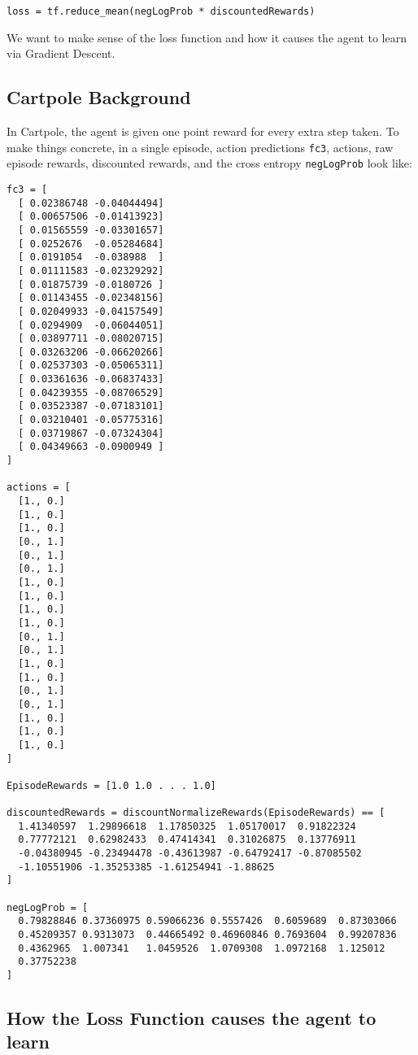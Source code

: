 \documentclass[10pt]{article}
\theoremstyle{plain}
\theoremstyle{definition}
\theoremstyle{remark}
\newcommand{\0}{\varnothing}
\newcommand{\<}{\langle}
\renewcommand{\>}{\rangle}
\begin{document}
\footnotesize
\begin{lstlisting}
loss = tf.reduce_mean(negLogProb * discountedRewards)
\end{lstlisting}
\normalsize

We want to make sense of the loss function and how it causes the agent to learn via Gradient Descent.

\subsection{Cartpole Background}

In Cartpole, the agent is given one point reward for every extra step taken. To make things concrete, in a single episode, action predictions \lstinline{fc3}, actions, raw episode rewards, discounted rewards, and the cross entropy \lstinline{negLogProb} look like:

\scriptsize
\begin{lstlisting}
fc3 = [
  [ 0.02386748 -0.04044494]
  [ 0.00657506 -0.01413923]
  [ 0.01565559 -0.03301657]
  [ 0.0252676  -0.05284684]
  [ 0.0191054  -0.038988  ]
  [ 0.01111583 -0.02329292]
  [ 0.01875739 -0.0180726 ]
  [ 0.01143455 -0.02348156]
  [ 0.02049933 -0.04157549]
  [ 0.0294909  -0.06044051]
  [ 0.03897711 -0.08020715]
  [ 0.03263206 -0.06620266]
  [ 0.02537303 -0.05065311]
  [ 0.03361636 -0.06837433]
  [ 0.04239355 -0.08706529]
  [ 0.03523387 -0.07183101]
  [ 0.03210401 -0.05775316]
  [ 0.03719867 -0.07324304]
  [ 0.04349663 -0.0900949 ]
]

actions = [
  [1., 0.]
  [1., 0.]
  [1., 0.]
  [0., 1.]
  [0., 1.]
  [0., 1.]
  [1., 0.]
  [1., 0.]
  [1., 0.]
  [1., 0.]
  [0., 1.]
  [0., 1.]
  [1., 0.]
  [1., 0.]
  [0., 1.]
  [0., 1.]
  [1., 0.]
  [1., 0.]
  [1., 0.]
]

EpisodeRewards = [1.0 1.0 . . . 1.0]

discountedRewards = discountNormalizeRewards(EpisodeRewards) == [
  1.41340597  1.29896618  1.17850325  1.05170017  0.91822324
  0.77772121  0.62982433  0.47414341  0.31026875  0.13776911
  -0.04380945 -0.23494478 -0.43613987 -0.64792417 -0.87085502
  -1.10551906 -1.35253385 -1.61254941 -1.88625
]

negLogProb = [
  0.79828846 0.37360975 0.59066236 0.5557426  0.6059689  0.87303066
  0.45209357 0.9313073  0.44665492 0.46960846 0.7693604  0.99207836
  0.4362965  1.007341   1.0459526  1.0709308  1.0972168  1.125012
  0.37752238
]
\end{lstlisting}
\normalsize

\subsection{How the Loss Function causes the agent to learn}
\end{document}
